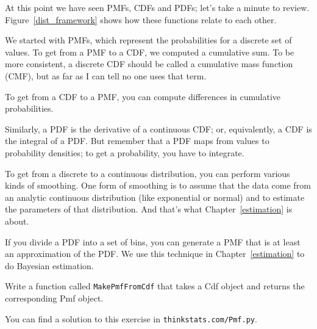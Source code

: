 \documentclass[12pt]{book}
\begin{document}
At this point we have seen PMFs, CDFs and PDFs; let's take a minute
to review.  Figure~\ref{dist_framework} shows how these functions relate
to each other.


We started with PMFs, which represent the probabilities for a discrete
set of values.  To get from a PMF to a CDF, we computed a cumulative sum.
To be more consistent, a discrete CDF should be called a cumulative mass
function (CMF), but as far as I can tell no one uses that term.


To get from a CDF to a PMF, you can compute differences in cumulative
probabilities.


Similarly, a PDF is the derivative of a continuous CDF; or, equivalently,
a CDF is the integral of a PDF.  But remember that a PDF maps from
values to probability densities; to get a probability, you have to
integrate.


To get from a discrete to a continuous distribution, you can perform
various kinds of smoothing.  One form of smoothing is to assume that
the data come from an analytic continuous distribution
(like exponential or normal) and to estimate the parameters of that
distribution.  And that's what Chapter~\ref{estimation} is about.



If you divide a PDF into a set of bins, you can generate a PMF that is
at least an approximation of the PDF.  We use this
technique in Chapter~\ref{estimation} to do Bayesian estimation.


\begin{ex}

Write a function called {\tt MakePmfFromCdf} that takes a Cdf object
and returns the corresponding Pmf object.

You can find a solution to this exercise in {\tt thinkstats.com/Pmf.py}.


\end{ex}
\end{document}
